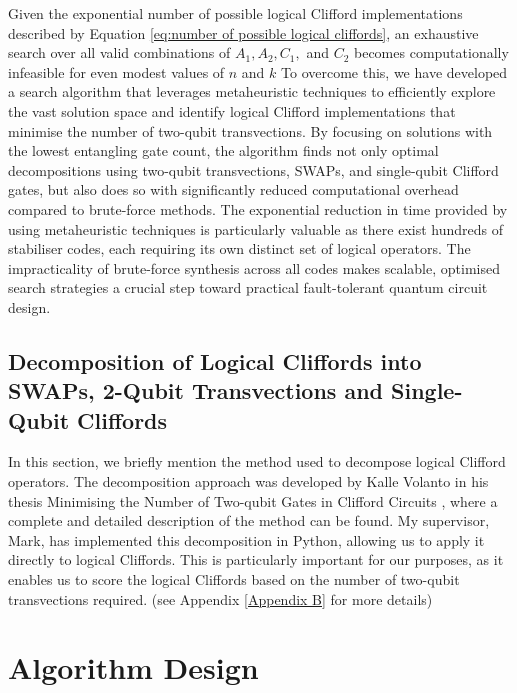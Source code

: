 Given the exponential number of possible logical Clifford implementations described by Equation \ref{eq:number of possible logical cliffords}, an exhaustive search over all valid combinations of \(A_1,A_2,C_1,\) and \(C_2\) becomes computationally infeasible for even modest values of \(n\) and \(k\) To overcome this, we have developed a search algorithm that leverages metaheuristic techniques to efficiently explore the vast solution space and identify logical Clifford implementations that minimise the number of two-qubit transvections. By focusing on solutions with the lowest entangling gate count, the algorithm finds not only optimal decompositions using two-qubit transvections, SWAPs, and single-qubit Clifford gates, but also does so with significantly reduced computational overhead compared to brute-force methods. The exponential reduction in time provided by using metaheuristic techniques is particularly valuable as there exist hundreds of stabiliser codes, each requiring its own distinct set of logical operators. The impracticality of brute-force synthesis across all codes makes scalable, optimised search strategies a crucial step toward practical fault-tolerant quantum circuit design.

\subsection{Decomposition of Logical Cliffords into SWAPs, 2-Qubit Transvections and Single-Qubit Cliffords}

In this section, we briefly mention the method used to decompose logical Clifford operators. The decomposition approach was developed by Kalle Volanto in his thesis Minimising the Number of Two-qubit Gates in Clifford Circuits \cite{volanto2023minimizing}, where a complete and detailed description of the method can be found. My supervisor, Mark, has implemented this decomposition in Python, allowing us to apply it directly to logical Cliffords. This is particularly important for our purposes, as it enables us to score the logical Cliffords based on the number of two-qubit transvections required. (see Appendix \ref{Appendix B} for more details)

\section{Algorithm Design}

